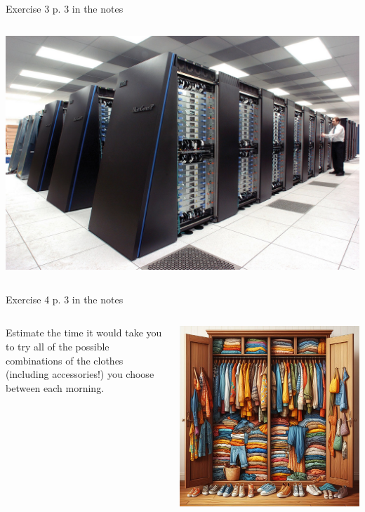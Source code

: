 \documentclass[10pt]{beamer}
\begin{document}
\begin{frame}
\begin{block}{Exercise 3 p. 3 in the notes}
\begin{columns}
\begin{column}{0.3\linewidth}
      \includegraphics[width=\linewidth]{img/IBM_Blue_Gene_P_supercomputer.jpg}
    \end{column}
    \end{columns}
  \end{block}
  \begin{block}{Exercise 4 p. 3 in the notes}
    \begin{columns}
      \begin{column}{0.6\linewidth}
   Estimate the time it would take you to try all of the possible combinations of the clothes (including accessories!) you choose between each morning. 
      \end{column}
      \begin{column}{0.3\linewidth}
      \includegraphics[width=0.8\linewidth]{./img/wardrobe.jpeg}
      \end{column}
    \end{columns}
  \end{block}
\end{frame}
\end{document}
